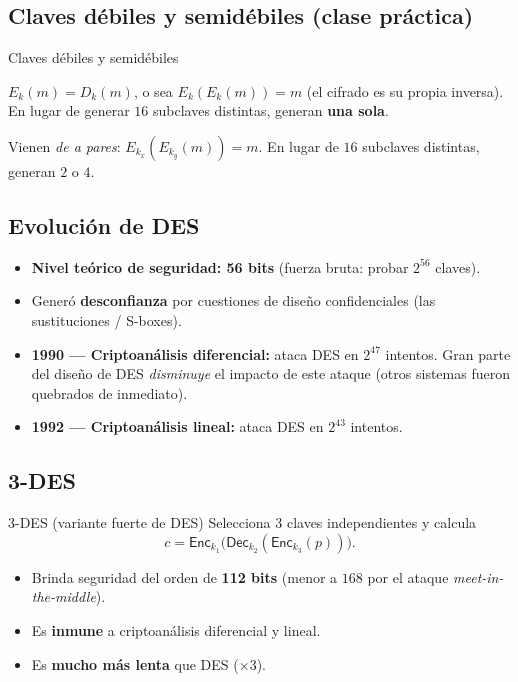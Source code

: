 \documentclass[11pt,a4paper]{article}
\newcommand{\Enc}{\mathsf{Enc}}
\newcommand{\Dec}{\mathsf{Dec}}
\begin{document}
\subsection{Claves débiles y semidébiles (clase práctica)}

\begin{practbox}{Claves débiles y semidébiles}
\begin{description}[leftmargin=0pt,style=nextline,itemsep=4pt]
  \item[Claves débiles.] $E_k(m)=D_k(m)$, o sea $E_k(E_k(m))=m$ (el cifrado es su propia
        inversa). En lugar de generar $16$ subclaves distintas, generan \textbf{una sola}.
  \item[Claves semidébiles.] Vienen \emph{de a pares}: $E_{k_x}(E_{k_y}(m))=m$. En lugar
        de $16$ subclaves distintas, generan $2$ o $4$.
\end{description}
\end{practbox}

\subsection{Evolución de DES}

\begin{slidebox}
\begin{itemize}[leftmargin=1.3em,itemsep=1pt]
  \item \textbf{Nivel teórico de seguridad: 56 bits} (fuerza bruta: probar $2^{56}$
        claves).
  \item Generó \textbf{desconfianza} por cuestiones de diseño confidenciales
        (las sustituciones / S-boxes).
  \item \textbf{1990 — Criptoanálisis diferencial:} ataca DES en $2^{47}$ intentos. Gran
        parte del diseño de DES \emph{disminuye} el impacto de este ataque (otros sistemas
        fueron quebrados de inmediato).
  \item \textbf{1992 — Criptoanálisis lineal:} ataca DES en $2^{43}$ intentos.
\end{itemize}
\end{slidebox}

\subsection{3-DES}

\begin{defbox}{3-DES (variante fuerte de DES)}
Selecciona 3 claves independientes y calcula
\[
  c = \Enc_{k_1}\!\big(\Dec_{k_2}(\Enc_{k_3}(p))\big).
\]
\begin{itemize}[leftmargin=1.4em,itemsep=1pt]
  \item Brinda seguridad del orden de \textbf{112 bits} (menor a $168$ por el ataque
        \emph{meet-in-the-middle}).
  \item Es \textbf{inmune} a criptoanálisis diferencial y lineal.
  \item Es \textbf{mucho más lenta} que DES ($\times 3$).
\end{itemize}
\end{defbox}
\end{document}
